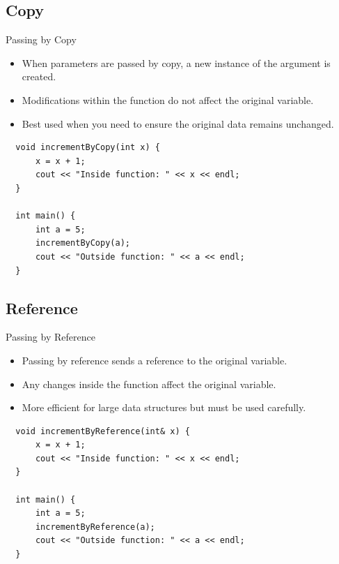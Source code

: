 \documentclass[10pt]{beamer}
\begin{document}
\subsection{Copy}
\begin{frame}[fragile]{Passing by Copy}
  \begin{itemize}
    \item When parameters are passed by copy, a new instance of the argument is created.
    \item Modifications within the function do not affect the original variable.
    \item Best used when you need to ensure the original data remains unchanged.
\end{itemize}

\begin{lstlisting}
  void incrementByCopy(int x) {
      x = x + 1;
      cout << "Inside function: " << x << endl;
  }
  
  int main() {
      int a = 5;
      incrementByCopy(a);
      cout << "Outside function: " << a << endl;
  }
  \end{lstlisting}

\end{frame}

\subsection{Reference}

\begin{frame}[fragile]{Passing by Reference}
  \begin{itemize}
    \item Passing by reference sends a reference to the original variable.
    \item Any changes inside the function affect the original variable.
    \item More efficient for large data structures but must be used carefully.
  \end{itemize}
  
  \begin{lstlisting}
  void incrementByReference(int& x) {
      x = x + 1;
      cout << "Inside function: " << x << endl;
  }
  
  int main() {
      int a = 5;
      incrementByReference(a);
      cout << "Outside function: " << a << endl;
  }
  \end{lstlisting}
\end{frame}
\end{document}
